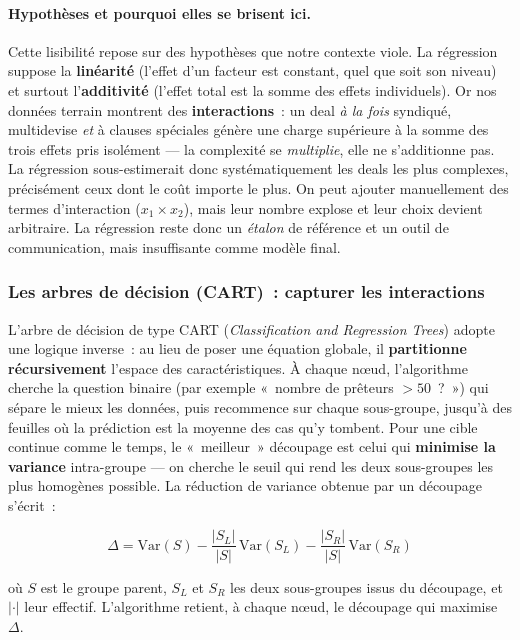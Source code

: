\paragraph{Hypothèses et pourquoi elles se brisent ici.}
Cette lisibilité repose sur des hypothèses que notre contexte viole. La régression
suppose la \textbf{linéarité} (l'effet d'un facteur est constant, quel que soit son
niveau) et surtout l'\textbf{additivité} (l'effet total est la somme des effets
individuels). Or nos données terrain montrent des \textbf{interactions}~: un deal
\emph{à la fois} syndiqué, multidevise \emph{et} à clauses spéciales génère une charge
supérieure à la somme des trois effets pris isolément --- la complexité se
\emph{multiplie}, elle ne s'additionne pas. La régression sous-estimerait donc
systématiquement les deals les plus complexes, précisément ceux dont le coût importe le
plus. On peut ajouter manuellement des termes d'interaction ($x_1 \times x_2$), mais leur
nombre explose et leur choix devient arbitraire. La régression reste donc un
\emph{étalon} de référence et un outil de communication, mais insuffisante comme modèle
final.

\subsubsection{Les arbres de décision (CART)~: capturer les interactions}

L'arbre de décision de type CART (\textit{Classification and Regression Trees}) adopte
une logique inverse~: au lieu de poser une équation globale, il \textbf{partitionne
récursivement} l'espace des caractéristiques. À chaque nœud, l'algorithme cherche la
question binaire (par exemple «~nombre de prêteurs $> 50$~?~») qui sépare le mieux les
données, puis recommence sur chaque sous-groupe, jusqu'à des feuilles où la prédiction
est la moyenne des cas qu'y tombent. Pour une cible continue comme le temps, le
«~meilleur~» découpage est celui qui \textbf{minimise la variance} intra-groupe --- on
cherche le seuil qui rend les deux sous-groupes les plus homogènes possible. La
réduction de variance obtenue par un découpage s'écrit~:

\begin{equation}
\Delta = \mathrm{Var}(S) - \frac{|S_L|}{|S|}\,\mathrm{Var}(S_L) - \frac{|S_R|}{|S|}\,\mathrm{Var}(S_R)
\label{eq:variance-reduction}
\end{equation}

\noindent où $S$ est le groupe parent, $S_L$ et $S_R$ les deux sous-groupes issus du
découpage, et $|\cdot|$ leur effectif. L'algorithme retient, à chaque nœud, le découpage
qui maximise $\Delta$.

